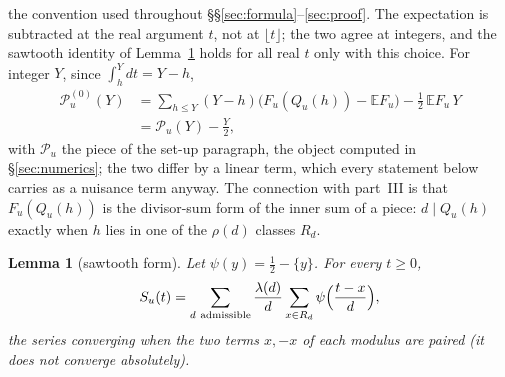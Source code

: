 \documentclass[11pt,a4paper]{article}
\newtheorem{lemma}[theorem]{Lemma}
\theoremstyle{remark}\newtheorem{remark}[theorem]{Remark}
\begin{document}
the convention used throughout \S\S\ref{sec:formula}--\ref{sec:proof}. The expectation is subtracted at the real
argument $t$, not at $\lfloor t\rfloor$; the two agree at integers, and the sawtooth identity of
Lemma~\ref{lem:sawtooth} holds for all real $t$ only with this choice. For integer $Y$, since $\int_h^Ydt=Y-h$,
\[
\begin{aligned}
\mathcal P^{(0)}_u(Y)&=\sum_{h\le Y}(Y-h)\bigl(F_u(Q_u(h))-\mathbb EF_u\bigr)-\tfrac12\,\mathbb EF_u\,Y\\
&=\mathcal P_u(Y)-\tfrac Y2 ,
\end{aligned}
\]
with $\mathcal P_u$ the piece of the set-up paragraph, the object computed in \S\ref{sec:numerics}; the two differ by
a linear term, which every statement below carries as a nuisance term anyway.
The connection with part~III is that $F_u(Q_u(h))$ is the divisor-sum form of the inner sum of a piece: $d\mid Q_u(h)$
exactly when $h$ lies in one of the $\rho(d)$ classes $R_d$.

\begin{lemma}[sawtooth form]\label{lem:sawtooth}
Let $\psi(y)=\tfrac12-\{y\}$. For every $t\ge0$,
\begin{equation}\label{eq:sawtooth}
S_u(t)=\sum_{d\ \mathrm{admissible}}\frac{\lambda(d)}d\sum_{x\in R_d}\psi\Bigl(\frac{t-x}d\Bigr),
\end{equation}
the series converging when the two terms $x,-x$ of each modulus are paired (it does not converge absolutely).
\end{lemma}
\end{document}
